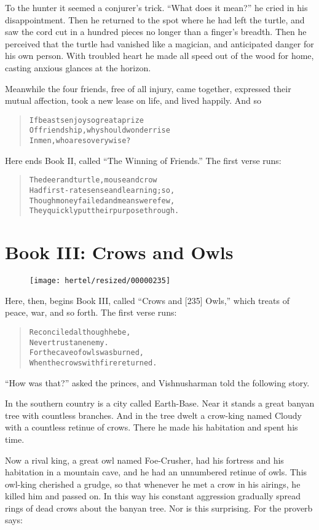 \documentclass[article, twoside, 10pt]{memoir}
\renewenvironment{verbatim}{%
\begin{quote}%
\vskip -10pt%
\begin{alltt}\normalfont\small}{\end{alltt}%
\end{quote}%
\vskip -10pt
} %
\begin{document}
To the hunter it seemed a conjurer's trick. ``What does it mean?''
he cried in his disappointment. Then he returned to the spot where
he had left the turtle, and saw the cord cut in a hundred pieces no
longer than a finger's breadth. Then he perceived that the turtle
had vanished like a magician, and anticipated danger for his own
person. With troubled heart he made all speed out of the wood for
home, casting anxious glances at the horizon.

Meanwhile the four friends, free of all injury, came together,
expressed their mutual affection, took a new lease on life, and
lived happily. And so

\begin{verbatim}
If beasts enjoy so great a prize
Of friendship, why should wonder rise
In men, who are so very wise?
\end{verbatim}
Here ends Book II, called ``The Winning of Friends.'' The first
verse runs:

\begin{verbatim}
The deer and turtle, mouse and crow
Had first-rate sense and learning; so,
Though money failed and means were few,
They quickly put their purpose through.
\end{verbatim}
\part{Book III: Crows and Owls}

\begin{figure}[p]\texttt{[image: hertel/resized/00000235]}\end{figure}Here, then, begins Book III, called ``Crows and [235] Owls,'' which
treats of peace, war, and so forth. The first verse runs:

\begin{verbatim}
Reconciled although he be,
Never trust an enemy.
For the cave of owls was burned,
When the crows with fire returned.
\end{verbatim}
``How was that?'' asked the princes, and Vishnusharman told the
following story.

In the southern country is a city called Earth-Base. Near it stands
a great banyan tree with countless branches. And in the tree dwelt
a crow-king named Cloudy with a countless retinue of crows. There
he made his habitation and spent his time.

Now a rival king, a great owl named Foe-Crusher, had his fortress
and his habitation in a mountain cave, and he had an unnumbered
retinue of owls. This owl-king cherished a grudge, so that whenever
he met a crow in his airings, he killed him and passed on. In this
way his constant aggression gradually spread rings of dead crows
about the banyan tree. Nor is this surprising. For the proverb
says:
\end{document}
